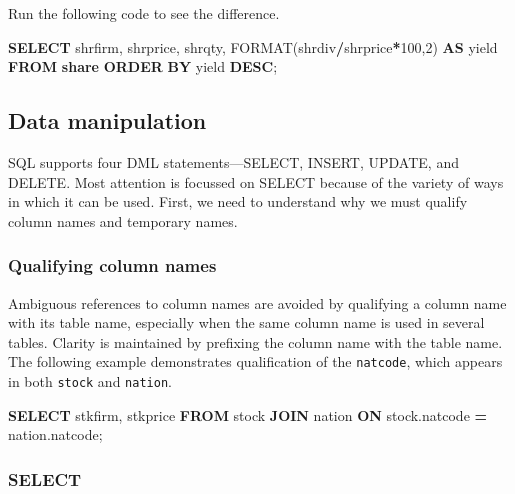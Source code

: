 \documentclass[
]{article}
\newenvironment{Shaded}{\begin{snugshade}}{\end{snugshade}}
\newcommand{\DecValTok}[1]{\textcolor[rgb]{0.00,0.00,0.81}{#1}}
\newcommand{\KeywordTok}[1]{\textcolor[rgb]{0.13,0.29,0.53}{\textbf{#1}}}
\newcommand{\NormalTok}[1]{#1}
\newcommand{\OperatorTok}[1]{\textcolor[rgb]{0.81,0.36,0.00}{\textbf{#1}}}
\begin{document}
Run the following code to see the difference.

\begin{Shaded}
\begin{Highlighting}[]
\KeywordTok{SELECT}\NormalTok{ shrfirm, shrprice, shrqty, FORMAT(shrdiv}\OperatorTok{/}\NormalTok{shrprice}\OperatorTok{*}\DecValTok{100}\NormalTok{,}\DecValTok{2}\NormalTok{)}
  \KeywordTok{AS}\NormalTok{ yield }\KeywordTok{FROM} \KeywordTok{share}
      \KeywordTok{ORDER} \KeywordTok{BY}\NormalTok{ yield }\KeywordTok{DESC}\NormalTok{;}
\end{Highlighting}
\end{Shaded}

\hypertarget{data-manipulation}{%
\subsection*{Data manipulation}\label{data-manipulation}}

SQL supports four DML statements---SELECT, INSERT, UPDATE, and DELETE.
Most attention is focussed on SELECT because of the variety of ways in
which it can be used. First, we need to understand why we must qualify
column names and temporary names.

\hypertarget{qualifying-column-names}{%
\subsubsection*{Qualifying column names}\label{qualifying-column-names}}

Ambiguous references to column names are avoided by qualifying a column
name with its table name, especially when the same column name is used
in several tables. Clarity is maintained by prefixing the column name
with the table name. The following example demonstrates qualification of
the \texttt{natcode}, which appears in both \texttt{stock} and
\texttt{nation}.

\begin{Shaded}
\begin{Highlighting}[]
\KeywordTok{SELECT}\NormalTok{ stkfirm, stkprice }\KeywordTok{FROM}\NormalTok{ stock }\KeywordTok{JOIN}\NormalTok{ nation}
    \KeywordTok{ON}\NormalTok{ stock.natcode }\OperatorTok{=}\NormalTok{ nation.natcode;}
\end{Highlighting}
\end{Shaded}

\hypertarget{select}{%
\subsubsection*{SELECT}\label{select}}
\end{document}

